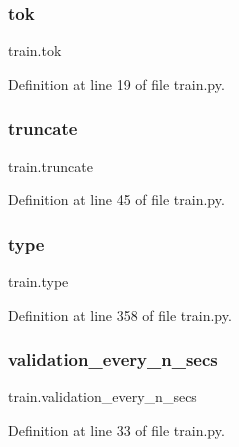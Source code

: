 \mbox{\label{namespacetrain_ad178c883b88a19efa8ae8c266db4fac3}} 
\subsubsection{\texorpdfstring{tok}{tok}}
{\footnotesize\ttfamily train.\+tok}



Definition at line 19 of file train.\+py.

\mbox{\label{namespacetrain_aa72e22a516ea2303faba3c129f9ba8dd}} 
\subsubsection{\texorpdfstring{truncate}{truncate}}
{\footnotesize\ttfamily train.\+truncate}



Definition at line 45 of file train.\+py.

\mbox{\label{namespacetrain_ad99775ad96e0996a8be4782b30a28c2e}} 
\subsubsection{\texorpdfstring{type}{type}}
{\footnotesize\ttfamily train.\+type}



Definition at line 358 of file train.\+py.

\mbox{\label{namespacetrain_a18ecadee82c97099a6c6e89cc8ba7532}} 
\subsubsection{\texorpdfstring{validation\+\_\+every\+\_\+n\+\_\+secs}{validation\_every\_n\_secs}}
{\footnotesize\ttfamily train.\+validation\+\_\+every\+\_\+n\+\_\+secs}



Definition at line 33 of file train.\+py.

